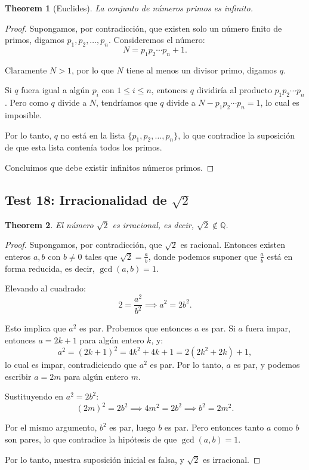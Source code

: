 \documentclass[11pt,a4paper]{article}
\theoremstyle{plain}
\newtheorem{theorem}{Theorem}[section]
\theoremstyle{definition}
\begin{document}
\begin{theorem}[Euclides]
La conjunto de números primos es infinito.
\end{theorem}

\begin{proof}
Supongamos, por contradicción, que existen solo un número finito de primos, digamos $p_1, p_2, \ldots, p_n$. Consideremos el número:
\[
N = p_1 p_2 \cdots p_n + 1.
\]

Claramente $N > 1$, por lo que $N$ tiene al menos un divisor primo, digamos $q$.

Si $q$ fuera igual a algún $p_i$ con $1 \leq i \leq n$, entonces $q$ dividiría al producto $p_1 p_2 \cdots p_n$. Pero como $q$ divide a $N$, tendríamos que $q$ divide a $N - p_1 p_2 \cdots p_n = 1$, lo cual es imposible.

Por lo tanto, $q$ no está en la lista $\{p_1, p_2, \ldots, p_n\}$, lo que contradice la suposición de que esta lista contenía todos los primos.

Concluimos que debe existir infinitos números primos.
\end{proof}

\subsection*{Test 18: Irracionalidad de $\sqrt{2}$}

\begin{theorem}
El número $\sqrt{2}$ es irracional, es decir, $\sqrt{2} \notin \mathbb{Q}$.
\end{theorem}

\begin{proof}
Supongamos, por contradicción, que $\sqrt{2}$ es racional. Entonces existen enteros $a, b$ con $b \neq 0$ tales que $\sqrt{2} = \frac{a}{b}$, donde podemos suponer que $\frac{a}{b}$ está en forma reducida, es decir, $\gcd(a, b) = 1$.

Elevando al cuadrado:
\[
2 = \frac{a^2}{b^2} \implies a^2 = 2b^2.
\]

Esto implica que $a^2$ es par. Probemos que entonces $a$ es par. Si $a$ fuera impar, entonces $a = 2k+1$ para algún entero $k$, y:
\[
a^2 = (2k+1)^2 = 4k^2 + 4k + 1 = 2(2k^2 + 2k) + 1,
\]
lo cual es impar, contradiciendo que $a^2$ es par. Por lo tanto, $a$ es par, y podemos escribir $a = 2m$ para algún entero $m$.

Sustituyendo en $a^2 = 2b^2$:
\[
(2m)^2 = 2b^2 \implies 4m^2 = 2b^2 \implies b^2 = 2m^2.
\]

Por el mismo argumento, $b^2$ es par, luego $b$ es par. Pero entonces tanto $a$ como $b$ son pares, lo que contradice la hipótesis de que $\gcd(a, b) = 1$.

Por lo tanto, nuestra suposición inicial es falsa, y $\sqrt{2}$ es irracional.
\end{proof}
\end{document}
